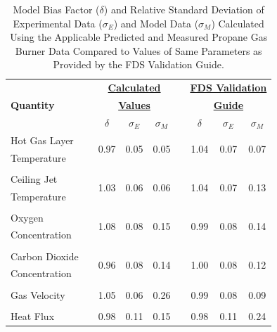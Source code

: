 \begin{table}[!ht]
\caption[Calculated $\delta$, $\sigma_E$, and $\sigma_M$ Values Compared to the Parameter Values Stated in FDS Validation Guide.]{Model Bias Factor ($\delta$) and Relative Standard Deviation of Experimental Data ($\sigma_E$) and Model Data ($\sigma_M$) Calculated Using the Applicable Predicted and Measured Propane Gas Burner Data Compared to Values of Same Parameters as Provided by the FDS Validation Guide.}
\begin{center}
\begin{tabular}{lcccccccc}
\toprule
					& & \multicolumn{3}{c}{\textbf{\underline{Calculated}}} & & \multicolumn{3}{c}{\textbf{\underline{FDS Validation}}}   \\
\textbf{Quantity} 	& & \multicolumn{3}{c}{\textbf{\underline{Values}}} 	& & \multicolumn{3}{c}{\textbf{\underline{Guide}}} \\
				 	& & $\delta$ 	&  $\sigma_E$ 	& 	$\sigma_M$ 			& & $\delta$ 	&  $\sigma_E$ 	& 	$\sigma_M$ 		\\	
\midrule
Hot Gas Layer 		& & \multirow{2}{*}{0.97} & \multirow{2}{*}{0.05} & \multirow{2}{*}{0.05} & & \multirow{2}{*}{1.04} & \multirow{2}{*}{0.07} & \multirow{2}{*}{0.07} 	\\
Temperature 		& &					   	  & 					  & 					  & &						& 					   &						\\
\multicolumn{9}{c}{} \\
Ceiling Jet 		& & \multirow{2}{*}{1.03} & \multirow{2}{*}{0.06} & \multirow{2}{*}{0.06} & & \multirow{2}{*}{1.04} & \multirow{2}{*}{0.07} & \multirow{2}{*}{0.13} 	\\
Temperature 		& & 					  & 					  & 					  & &						& 					   &						\\
\multicolumn{9}{c}{} \\
Oxygen 				& & \multirow{2}{*}{1.08}  & \multirow{2}{*}{0.08} & \multirow{2}{*}{0.15} & & \multirow{2}{*}{0.99} & \multirow{2}{*}{0.08} & \multirow{2}{*}{0.14} 	\\
Concentration 		& & 					   & 					  & 					   & & 						& 					   &						\\
\multicolumn{9}{c}{} \\
Carbon Dioxide 		& & \multirow{2}{*}{0.96}  & \multirow{2}{*}{0.08} & \multirow{2}{*}{0.14} & & \multirow{2}{*}{1.00} & \multirow{2}{*}{0.08} & \multirow{2}{*}{0.12} 	\\
Concentration 		& & 					   & 					  & 					   & & 						& 					   &						\\
\multicolumn{9}{c}{} \\
Gas Velocity 		& & 1.05  & 0.06 & 0.26 & & 0.99 & 0.08 & 0.09 	\\
\multicolumn{9}{c}{} \\
Heat Flux 			& & 0.98  & 0.11 & 0.15 & & 0.98 & 0.11 & 0.24 	\\
\bottomrule
\end{tabular}
\end{center}
\label{table:stats_compare}
\end{table}
\FloatBarrier

